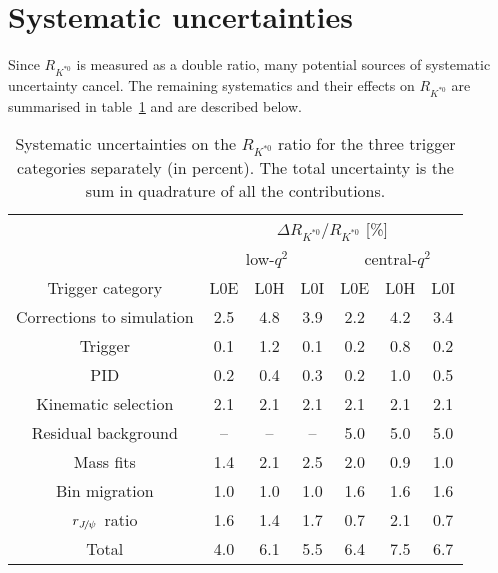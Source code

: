 \documentclass[12pt,a4paper]{article}
\def\RKst    {\mbox{R_{\Kstarz}}}
\def\Ppsi        {\ensuremath{\uppsi}\xspace}
\def\PJ      {\ensuremath{\mathrm{J}}\xspace}
\def\PK      {\ensuremath{\mathrm{K}}\xspace}
\def\Ppsi        {\ensuremath{\psi}\xspace}
\def\PJ      {\ensuremath{J}\xspace}
\def\PK      {\ensuremath{K}\xspace}
\def\kaon  {\ensuremath{\PK}\xspace}
\def\Kstarz  {\ensuremath{\kaon^{*0}}\xspace}
\def\jpsi     {\ensuremath{{\PJ\mskip -3mu/\mskip -2mu\Ppsi\mskip 2mu}}\xspace}
\def\qsq       {\ensuremath{q^2}\xspace}
\def\lqsq{low-\qsq}
\def\cqsq{central-\qsq}
\def\loe{\textrm{L0E}\xspace}
\def\loh{\textrm{L0H}\xspace}
\def\loi{\textrm{L0I}\xspace}
\def\RJPs{\ensuremath{r_{\jpsi}}\xspace}
\def\RKst{\ensuremath{R_{\Kstarz}}\xspace}
\begin{document}
\section{Systematic uncertainties}
\label{sec:systematics}

Since \RKst is measured as a double ratio, many potential sources of systematic uncertainty cancel.
The remaining  systematics  and their effects on  \RKst  are summarised in table~\ref{tab:systematics} and are described below.

\begin{table}[t!]
\centering
\caption{Systematic uncertainties on the \RKst ratio for the three trigger categories separately (in percent). The total uncertainty is the sum in quadrature of all the contributions.}
\label{tab:systematics}
\renewcommand\arraystretch{1.4}
\begin{tabular}{c|ccc|ccc}
							& \multicolumn{6}{c}{$\Delta\RKst/\RKst$ [\%]} \\ \cline{2-7}
							& \multicolumn{3}{c|}{\lqsq}	& \multicolumn{3}{c}{\cqsq} \\ \hline
Trigger category		& \loe & \loh & \loi & \loe & \loh & \loi \\ \hline
Corrections to simulation	& 2.5 & 4.8 & 3.9 & 2.2 & 4.2 & 3.4\\
Trigger				& 0.1 & 1.2 & 0.1 & 0.2 & 0.8 & 0.2 \\
PID					& 0.2 & 0.4 & 0.3 & 0.2 & 1.0 & 0.5 \\
Kinematic selection		& 2.1 & 2.1 & 2.1 & 2.1 & 2.1 & 2.1 \\
Residual background	& -- & -- & -- & 5.0 & 5.0 & 5.0 \\
Mass fits				& 1.4 & 2.1 & 2.5 & 2.0 & 0.9 & 1.0 \\
Bin migration			& 1.0 & 1.0 & 1.0 & 1.6 & 1.6 & 1.6 \\
\RJPs ratio			& 1.6 & 1.4 & 1.7 & 0.7 & 2.1 & 0.7 \\
\hline
Total					& 4.0 & 6.1 & 5.5 & 6.4 & 7.5 & 6.7
\end{tabular}
\end{table}
\end{document}
